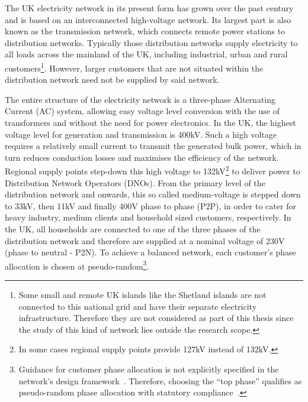 The UK electricity network in its present form has grown over the past century and is based on an interconnected high-voltage network.
Its largest part is also known as the transmission network, which connects remote power stations to distribution networks.
Typically those distribution networks supply electricity to all loads across the mainland of the UK, including industrial, urban and rural customers\footnote{Some small and remote UK islands like the Shetland islands are not connected to this national grid and have their separate electricity infrastructure. Therefore they are not considered as part of this thesis since the study of this kind of network lies outside the research scope.}.
However, larger customers that are not situated within the distribution network need not be supplied by said network.

The entire structure of the electricity network is a three-phase Alternating Current (AC) system, allowing easy voltage level conversion with the use of transformers and without the need for power electronics.
In the UK, the highest voltage level for generation and transmission is 400kV.
Such a high voltage requires a relatively small current to transmit the generated bulk power, which in turn reduces conduction losses and maximises the efficiency of the network.
Regional supply points step-down this high voltage to 132kV\footnote{In some cases regional supply points provide 127kV instead of 132kV.} to deliver power to Distribution Network Operators (DNOs).
From the primary level of the distribution network and onwards, this so called medium-voltage is stepped down to 33kV, then 11kV and finally 400V phase to phase (P2P), in order to cater for heavy industry, medium clients and household sized customers, respectively.
In the UK, all households are connected to one of the three phases of the distribution network and therefore are supplied at a nominal voltage of 230V (phase to neutral - P2N).
To achieve a balanced network, each customer's phase allocation is chosen at pseudo-random\footnote{Guidance for customer phase allocation is not explicitly specified in the network's design framework~\cite{UKPowerNetworks2014}. Therefore, choosing the ``top phase'' qualifies as pseudo-random phase allocation with statutory compliance~\cite{StatutoryInstruments2015}.}.


